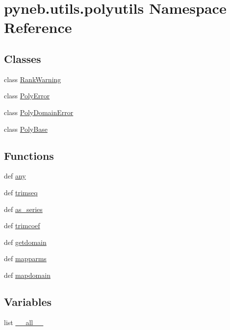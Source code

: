 \hypertarget{namespacepyneb_1_1utils_1_1polyutils}{\section{pyneb.\-utils.\-polyutils Namespace Reference}
\label{namespacepyneb_1_1utils_1_1polyutils}
}
\subsection*{Classes}
\begin{DoxyCompactItemize}
\item 
class \hyperlink{classpyneb_1_1utils_1_1polyutils_1_1_rank_warning}{Rank\-Warning}
\item 
class \hyperlink{classpyneb_1_1utils_1_1polyutils_1_1_poly_error}{Poly\-Error}
\item 
class \hyperlink{classpyneb_1_1utils_1_1polyutils_1_1_poly_domain_error}{Poly\-Domain\-Error}
\item 
class \hyperlink{classpyneb_1_1utils_1_1polyutils_1_1_poly_base}{Poly\-Base}
\end{DoxyCompactItemize}
\subsection*{Functions}
\begin{DoxyCompactItemize}
\item 
def \hyperlink{namespacepyneb_1_1utils_1_1polyutils_ae57e4cc7030d5459a7e7c1f61d7ed9a8}{any}
\item 
def \hyperlink{namespacepyneb_1_1utils_1_1polyutils_a973183162fdba436dae4946ec78c009b}{trimseq}
\item 
def \hyperlink{namespacepyneb_1_1utils_1_1polyutils_a9c3751d438f0f75922155c7823fe2699}{as\-\_\-series}
\item 
def \hyperlink{namespacepyneb_1_1utils_1_1polyutils_a505e3038cfd08b7f444ecca2234daa46}{trimcoef}
\item 
def \hyperlink{namespacepyneb_1_1utils_1_1polyutils_afbf8321a135ca2dc247215e16ea3399f}{getdomain}
\item 
def \hyperlink{namespacepyneb_1_1utils_1_1polyutils_a6d5e6ebb1be7c9077ec3ae28e803c83c}{mapparms}
\item 
def \hyperlink{namespacepyneb_1_1utils_1_1polyutils_ad7fe440bbe8d96e839de461f4db98cef}{mapdomain}
\end{DoxyCompactItemize}
\subsection*{Variables}
\begin{DoxyCompactItemize}
\item 
list \hyperlink{namespacepyneb_1_1utils_1_1polyutils_a5e54a45bb5c6fa4444f663a0b0da0e1f}{\-\_\-\-\_\-all\-\_\-\-\_\-}
\end{DoxyCompactItemize}


